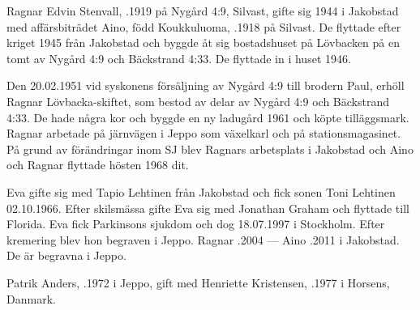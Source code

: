 Ragnar Edvin Stenvall, .1919 på Nygård 4:9, Silvast, gifte sig 1944 i Jakobstad med affärsbiträdet Aino, född Koukkuluoma, .1918 på Silvast. De flyttade efter kriget 1945 från Jakobstad	och byggde åt sig bostadshuset på Lövbacken på en tomt av Nygård 4:9 och Bäckstrand 4:33. De flyttade in i huset 1946.

Den 20.02.1951 vid syskonens försäljning av Nygård 4:9 till brodern Paul, erhöll Ragnar Lövbacka-skiftet, som bestod av delar av Nygård 4:9 och Bäckstrand 4:33. De hade några kor och byggde en ny ladugård 1961 och köpte tilläggsmark. Ragnar arbetade på järnvägen i Jeppo som växelkarl och på stationsmagasinet. På grund av förändringar inom SJ blev Ragnars arbetsplats i Jakobstad och Aino och Ragnar flyttade hösten 1968 dit.
\begin{jhchildren}
  \item {}
  \item {}
\end{jhchildren}
Eva gifte sig med Tapio Lehtinen från Jakobstad och fick sonen Toni Lehtinen 02.10.1966. Efter skilsmässa gifte Eva sig med Jonathan Graham och flyttade till Florida. Eva fick Parkinsons sjukdom och dog 18.07.1997 i Stockholm. Efter kremering blev hon begraven i Jeppo.
Ragnar .2004  ---  Aino .2011 i Jakobstad. De är begravna i Jeppo.






Patrik Anders, .1972 i Jeppo, gift med Henriette Kristensen, .1977 i Horsens, Danmark.
\begin{jhchildren}
  \item {}
  \item {}
  \item {}
  \item {}
  \item {}
\end{jhchildren}

